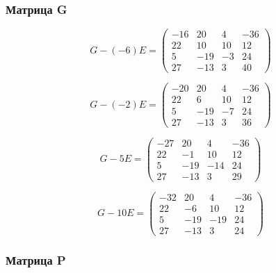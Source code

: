 \documentclass[12pt, a4paper]{article}
\begin{document}
    \subsubsection{Матрица G}

    \begin{equation}
        G - (-6) E = \left(\begin{matrix}
            -16 & 20 & 4 & -36 \\
            22 & 10 & 10 & 12 \\
            5 & -19 & -3 & 24 \\
            27 & -13 & 3 & 40
        \end{matrix}\right)
    \end{equation}

    \begin{equation}
        G - (-2) E = \left(\begin{matrix}
            -20 & 20 & 4 & -36 \\
            22 & 6 & 10 & 12 \\
            5 & -19 & -7 & 24 \\
            27 & -13 & 3 & 36
        \end{matrix}\right)
    \end{equation}

    \begin{equation}
        G - 5 E = \left(\begin{matrix}
            -27 & 20 & 4 & -36 \\
            22 & -1 & 10 & 12 \\
            5 & -19 & -14 & 24 \\
            27 & -13 & 3 & 29
        \end{matrix}\right)
    \end{equation}

    \begin{equation}
        G - 10 E = \left(\begin{matrix}
            -32 & 20 & 4 & -36 \\
            22 & -6 & 10 & 12 \\
            5 & -19 & -19 & 24 \\
            27 & -13 & 3 & 24
        \end{matrix}\right)
    \end{equation}




    \subsubsection{Матрица P}
\end{document}
